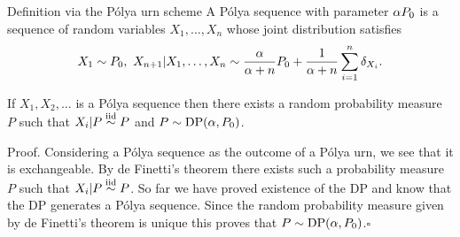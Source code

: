 \begin{frame}{Definition via the P\'olya urn scheme}
A P\'olya sequence with parameter $\alpha P_0$ is a sequence of random variables $X_1, \ldots, X_n$ whose joint distribution satisfies
\begin{equation*}
    X_1 \sim P_0,\ X_{n+1}|X_1,\ldots,X_n\sim \frac{\alpha}{\alpha + n}P_0 + \frac{1}{\alpha + n}\sum_{i=1}^n \delta_{X_i}.
\end{equation*}\pause

\begin{theorem}
If $X_1,X_2,\ldots $ is a P\'olya sequence then there exists a random probability measure $P$ such that $X_i|P\stackrel{\mbox{\scriptsize{iid}}}{\sim} P$ and $P\sim \text{DP}(\alpha, P_0)$.
\end{theorem}\pause

\alert{Proof.}
Considering a P\'olya sequence as the outcome of a P\'olya urn, we see that it is exchangeable. By de Finetti's theorem there exists such a probability measure $P$ such that $X_i|P \stackrel{\mbox{\scriptsize{iid}}}{\sim} P$. So far we have proved existence of the DP and know that the DP generates a P\'olya sequence. Since the random probability measure given by de Finetti's theorem is unique this proves that
$P\sim \text{DP}(\alpha, P_0)$.\hfill $\square$

\end{frame}







